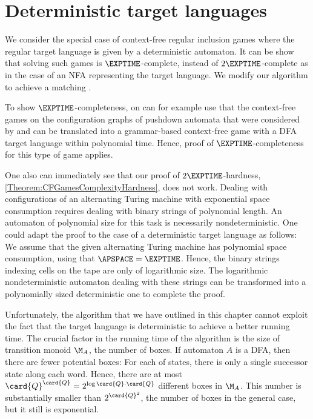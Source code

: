 \documentclass[../../diss.tex]{subfiles}
\begin{document}
\section{Deterministic target languages}%
\label{Section:CFGamesDeterministic}%

We consider the special case of context-free regular inclusion games where the regular target language is given by a deterministic automaton.
It can be show that solving such games is $\EXPTIME$-complete, instead of $2\EXPTIME$-complete as in the case of an NFA representing the target language.
We modify our algorithm to achieve a matching .

To show $\EXPTIME$-completeness, on can for example use that the context-free games on the configuration graphs of pushdown automata that were considered by  and  can be translated into a grammar-based context-free game with a DFA target language within polynomial time.
Hence, \Walus proof of $\EXPTIME$-completeness for this type of game applies.

One also can immediately see that our proof of $2\EXPTIME$-hardness, \cref{Theorem:CFGamesComplexityHardness}, does not work.
Dealing with configurations of an alternating Turing machine with exponential space consumption requires dealing with binary strings of polynomial length.
An automaton of polynomial size for this task is necessarily nondeterministic.
One could adapt the proof to the case of a deterministic target language as follows:
We assume that the given alternating Turing machine has polynomial space consumption, using that $\APSPACE = \EXPTIME$.
Hence, the binary strings indexing cells on the tape are only of logarithmic size.
The logarithmic nondeterministic automaton dealing with these strings can be transformed into a polynomially sized deterministic one to complete the proof.

Unfortunately, the algorithm that we have outlined in this chapter cannot exploit the fact that the target language is deterministic to achieve a better running time.
The crucial factor in the running time of the algorithm is the size of transition monoid $\nfatransmonoid{A}$, the number of boxes.
If automaton $A$ is a DFA, then there are fewer potential boxes:
For each of states, there is only a single successor state along each word.
Hence, there are at most $\card{Q}^{\card{Q}} = 2^{\log \card{Q} \cdot \card{Q}}$ different boxes in  $\nfatransmonoid{A}$.
This number is substantially smaller than $2^{\card{Q}^2}$, the number of boxes in the general case, but it still is exponential.
\end{document}
